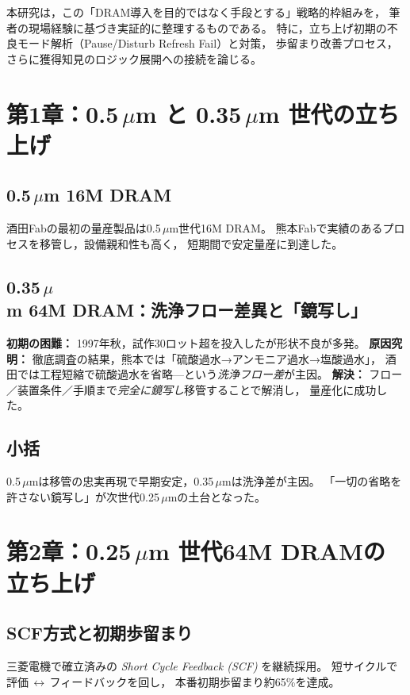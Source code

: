 \documentclass[conference]{IEEEtran}
\begin{document}
本研究は，この「DRAM導入を目的ではなく手段とする」戦略的枠組みを，
筆者の現場経験に基づき実証的に整理するものである。
特に，立ち上げ初期の不良モード解析（Pause/Disturb Refresh Fail）と対策，
歩留まり改善プロセス，さらに獲得知見のロジック展開への接続を論じる。

\section{第1章：0.5\,\texorpdfstring{$\mu$m}{μm} と 0.35\,\texorpdfstring{$\mu$m}{μm} 世代の立ち上げ}

\subsection{0.5\,$\mu$m 16M DRAM}
酒田Fabの最初の量産製品は0.5\,$\mu$m世代16M DRAM。
熊本Fabで実績のあるプロセスを移管し，設備親和性も高く，
短期間で安定量産に到達した。

\subsection{0.35\,$\mu$m 64M DRAM：洗浄フロー差異と「鏡写し」}
\textbf{初期の困難：}
1997年秋，試作30ロット超を投入したが形状不良が多発。
\textbf{原因究明：}
徹底調査の結果，熊本では「硫酸過水→アンモニア過水→塩酸過水」，
酒田では工程短縮で硫酸過水を省略—という\emph{洗浄フロー差}が主因。
\textbf{解決：}
フロー／装置条件／手順まで\emph{完全に鏡写し}移管することで解消し，
量産化に成功した。

\subsection{小括}
0.5\,$\mu$mは移管の忠実再現で早期安定，0.35\,$\mu$mは洗浄差が主因。
「一切の省略を許さない鏡写し」が次世代0.25\,$\mu$mの土台となった。

\section{第2章：0.25\,\texorpdfstring{$\mu$m}{μm} 世代64M DRAMの立ち上げ}

\subsection{SCF方式と初期歩留まり}
三菱電機で確立済みの \emph{Short Cycle Feedback (SCF)} を継続採用。
短サイクルで評価\,$\leftrightarrow$\,フィードバックを回し，
本番初期歩留まり約65\%を達成。
\end{document}
